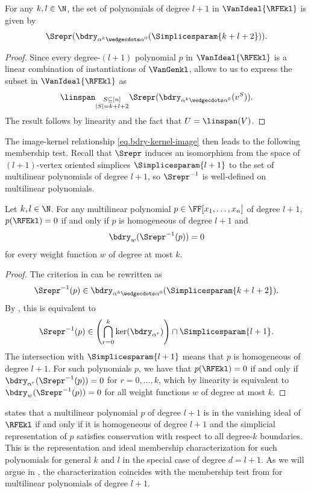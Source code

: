 \documentclass{toc}
\begin{document}
\begin{corollary}
  \label{cor.simplicial-vangen}
  For any \(k,l \in \N\), the set of polynomials of degree $l+1$ in \(\VanIdeal{\RFEkl}\) is given by
  \[\Srepr(\bdry_{\alpha^k\wedgecdots\alpha^0}(\Simplicesparam{k+l+2})). \]
\end{corollary}
\begin{proof}
Since every degree-\((l+1)\) polynomial $p$ in \(\VanIdeal{\RFEkl}\) is a linear combination of instantiations of \(\VanGenkl\),  allows to us to express the subset in \(\VanIdeal{\RFEkl}\) as
\[\linspan_{\substack{S \subseteq [n]\\ |S|=k+l+2}} \Srepr(\bdry_{\alpha^k\wedgecdots\alpha^0}(v^S)).\]
The result follows by linearity and the fact that $U = \linspan(V)$. 
\end{proof}

The image-kernel relationship \eqref{eq.bdry-kernel-image} then leads to the following membership test. Recall that $\Srepr$ induces an isomorphism from the space of $(l+1)$-vertex oriented simplices $\Simplicesparam{l+1}$ to the set of multilinear polynomials of degree $l+1$, so $\Srepr^{-1}$ is well-defined on multilinear polynomials.
\begin{theorem}
  \label{thm.vanideal-char.base}
  Let \(k,l \in \N\).
  For any multilinear polynomial \(p\in\FF[x_1,\ldots,x_n]\) of
  degree \(l+1\),
  \(p(\RFEkl) = 0\) if and only if $p$ is homogeneous of degree $l+1$ and
  \[
    \bdry_w( \Srepr^{-1}(p) ) = 0
  \]
  for every weight function \(w\) of degree at most \(k\).
\end{theorem}
\begin{proof}
The criterion in  can be rewritten as 
\[ \Srepr^{-1}(p)\in \bdry_{\alpha^k\wedgecdots\alpha^0}(\Simplicesparam{k+l+2}). \]
By , this is equivalent to
\[ \Srepr^{-1}(p)\in \left(\bigcap_{r=0}^{k} \ker(\bdry_{\alpha^r})\right)\cap \Simplicesparam{l+1}. 
\]
The intersection with $\Simplicesparam{l+1}$ means that $p$ is homogeneous of degree $l+1$. For such polynomials $p$, we have that \(p(\RFEkl) = 0\) if and only if  \( \bdry_{\alpha^r}(\Srepr^{-1}(p))=0 \) for $r=0,\dots,k$, which by linearity is equivalent to \( \bdry_{w}(\Srepr^{-1}(p))=0 \) for all weight functions \(w\) of degree at most \(k\).
\end{proof}
 states that a multilinear polynomial $p$ of degree \(l+1\) is in the vanishing ideal of \(\RFEkl\) if and only if it is homogeneous of degree $l+1$ and the simplicial representation of $p$ satisfies conservation with respect to all degree-\(k\) boundaries. This is the representation and ideal membership characterization for such polynomials for general \(k\) and \(l\) in the special case of degree \(d = l+1\). As we will argue in , the characterization coincides with the membership test from  for multilinear polynomials of degree \(l+1\). 
\end{document}
